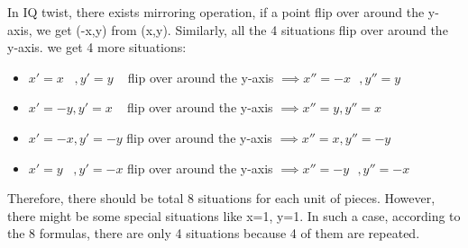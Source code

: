 In IQ twist, there exists mirroring operation, if a point flip over around the y-axis, we get  (-x,y) from (x,y). Similarly, all the 4 situations flip over around the y-axis. we get 4 more situations: 
\begin{itemize}
  \item  $x'=x\hspace{10pt}, y'=y\hspace{10pt}$    flip over around the y-axis $\implies x''=-x\hspace{8pt},y''=y$
  \item  $x'=-y, y'=x\hspace{10pt}$                flip over around the y-axis $\implies x''=y,y''=x$
  \item  $x'=-x, y'=-y$               flip over around the y-axis $\implies x''=x, y''=-y$
  \item  $x'=y\hspace{10pt},y'=-x$    flip over around the y-axis $\implies x''=-y\hspace{8pt}, y''=-x$
\end{itemize}
Therefore, there should be total 8 situations for each unit of pieces. However, there might be some special situations like x=1, y=1. In such a case, according to the 8 formulas, there are only 4 situations because 4 of them are repeated.
